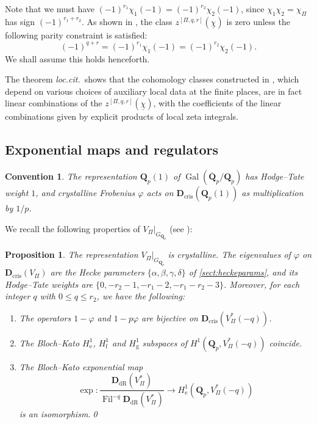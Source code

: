 \documentclass[cjm]{ipart}
\theoremstyle{plain}
\newtheorem{proposition}[theorem]{Proposition}
\newtheorem*{convention}{Convention}
\theoremstyle{remark}
\DeclareMathOperator{\Fil}{Fil}
\DeclareMathOperator{\Gal}{Gal}
\newcommand{\Dcris}{\mathbf{D}_{\mathrm{cris}}}
\newcommand{\DdR}{\mathbf{D}_{\mathrm{dR}}}
\newcommand{\QQbar}{\overline{\QQ}}
\newcommand{\QQ}{\mathbf{Q}}
\newcommand{\Qp}{\QQ_p}
\newcommand{\uchi}{\underline{\chi}}
\numberwithin{equation}{subsection}
\renewcommand{\le}{\leqslant}
\begin{document}
  Note that we must have $(-1)^{r_1} \chi_1(-1) = (-1)^{r_2}\chi_2(-1)$, since $\chi_1\chi_2 = \chi_{\Pi}$ has sign $(-1)^{r_1 + r_2}$. As shown in \cite[Corollary 3.6.2]{LZ-equivar}, the class $z^{[\Pi, q, r]}(\uchi)$ is zero unless the following parity constraint is satisfied:
  \begin{equation}
   \label{eq:parity}
   (-1)^{q + r} = (-1)^{r_1} \chi_1(-1) = (-1)^{r_2} \chi_2(-1).
  \end{equation}
  We shall assume this holds henceforth.

  The theorem \emph{loc.cit.}~shows that the cohomology classes constructed in \cite{LSZ17}, which depend on various choices of auxiliary local data at the finite places, are in fact linear combinations of the $z^{[\Pi, q, r]}(\uchi)$, with the coefficients of the linear combinations given by explicit products of local zeta integrals.

 \subsection{Exponential maps and regulators}

  \begin{convention}
  	The representation $\Qp(1)$ of $\Gal(\QQbar_p / \Qp)$ has Hodge--Tate weight $1$, and crystalline Frobenius $\varphi$ acts on $\Dcris(\Qp(1))$ as multiplication by $1/p$.
  \end{convention}

  We recall the following properties of $V_{\Pi} |_{G_{\Qp}}$ (see \cite[\S 6.1]{LZ-equivar}):

  \begin{proposition}\label{lemma:h1g}
   \label{prop:Dcrisevals}
   The representation $V_{\Pi} |_{G_{\Qp}}$ is crystalline. The eigenvalues of $\varphi$ on $\Dcris(V_{\Pi})$ are the Hecke parameters $\{ \alpha, \beta, \gamma, \delta\}$ of \cref{sect:heckeparams}, and its Hodge--Tate weights are $\{0, -r_2-1, -r_1-2, -r_1-r_2-3\}$. Moreover, for each integer $q$ with $0 \le q \le r_2$, we have the following:
   \begin{enumerate}
    \item[(a)] The operators $1 - \varphi$ and $1 - p\varphi$ are bijective on $\Dcris(V_\Pi^*(-q))$.
    \item[(b)] The Bloch--Kato $H^1_{\mathrm{e}}$, $H^1_{\mathrm{f}}$ and $H^1_{\mathrm{g}}$ subspaces of $H^1(\Qp, V_\Pi^*(-q))$ coincide.
    \item[(c)] The Bloch--Kato exponential map
    \[   \exp: \frac{\DdR(V_\Pi^*)}{\Fil^{-q} \DdR(V_\Pi^*)} \to H^1_{\mathrm{e}}(\Qp, V_\Pi^*(-q))\]
    is an isomorphism.\qed
   \end{enumerate}
  \end{proposition}
\end{document}
